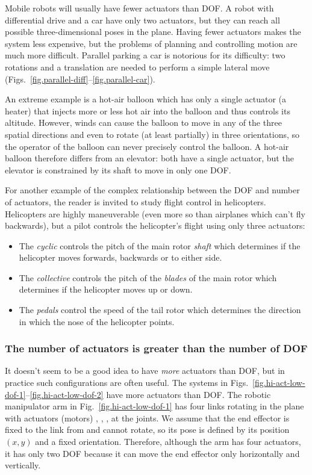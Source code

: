 Mobile robots will usually have fewer actuators than DOF. A robot with differential drive and a car have only two actuators, but they can reach all possible three-dimensional poses in the plane. Having fewer actuators makes the system less expensive, but the problems of planning and controlling motion are much more difficult. Parallel parking a car is notorious for its difficulty:  two rotations and a translation are needed to perform a simple lateral move (Figs.~\ref{fig.parallel-diff}--\ref{fig.parallel-car}).

An extreme example is a hot-air balloon which has only a single actuator (a heater) that injects more or less hot air into the balloon and thus controls its altitude. However, winds can cause the balloon to move in any of the three spatial directions and even to rotate (at least partially) in three orientations, so the operator of the balloon can never precisely control the balloon. A hot-air balloon therefore differs from an elevator: both have a single actuator, but the elevator is constrained by its shaft to move in only one DOF.

For another example of the complex relationship between the DOF and number of actuators, the reader is invited to study flight control in helicopters. Helicopters are highly maneuverable (even more so than airplanes which can't fly backwards), but a pilot controls the helicopter's flight using only three actuators:
\begin{itemize}
\item The \emph{cyclic} controls the pitch of the main rotor \emph{shaft} which determines if the helicopter moves forwards, backwards or to either side.
\item The \emph{collective} controls the pitch of the \emph{blades} of the main rotor which determines if the helicopter moves up or down.
\item The \emph{pedals} control the speed of the tail rotor which determines the direction in which the nose of the helicopter points.
\end{itemize}

\subsubsection*{The number of actuators is greater than the number of DOF}

It doesn't seem to be a good idea to have \emph{more} actuators than DOF, but in practice such configurations are often useful. The systems in Figs.~\ref{fig.hi-act-low-dof-1}--\ref{fig.hi-act-low-dof-2} have more actuators than DOF. The robotic manipulator arm in Fig.~\ref{fig.hi-act-low-dof-1} has four links rotating in the plane with actuators (motors) , , ,  at the joints. We assume that the end effector is fixed to the link from  and cannot rotate, so its pose is defined by its position $(x,y)$ and a fixed orientation. Therefore, although the arm has four actuators, it has only two DOF because it can move the end effector only horizontally and vertically.

